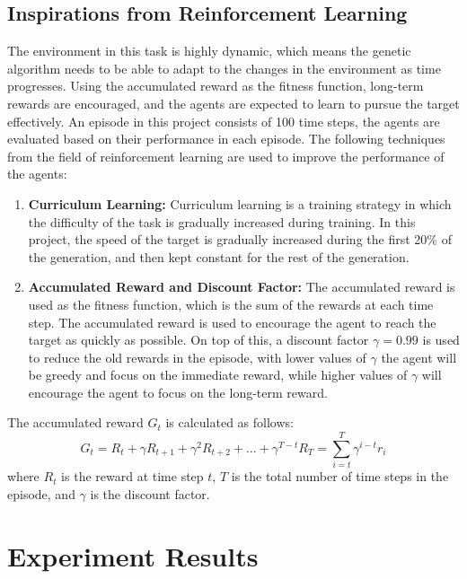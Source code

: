 \documentclass[sigconf]{acmart}
\begin{document}
\subsection{Inspirations from Reinforcement Learning}
The environment in this task is highly dynamic, which means the genetic algorithm needs to be able to adapt to the changes in the environment as time progresses. Using the accumulated reward as the fitness function, long-term rewards are encouraged, and the agents are expected to learn to pursue the target effectively.
An episode in this project consists of 100 time steps, the agents are evaluated based on their performance in each episode. The following techniques from the field of reinforcement learning are used to improve the performance of the agents:
\begin{enumerate}
  \item \textbf{Curriculum Learning:} Curriculum learning is a training strategy in which the difficulty of the task is gradually increased during training. In this project, the speed of the target is gradually increased during the first 20\% of the generation, and then kept constant for the rest of the generation.
  \item \textbf{Accumulated Reward and Discount Factor:} The accumulated reward is used as the fitness function, which is the sum of the rewards at each time step. The accumulated reward is used to encourage the agent to reach the target as quickly as possible. On top of this, a discount factor $\gamma = 0.99$ is used to reduce the old rewards in the episode, with lower values of $\gamma$ the agent will be greedy and focus on the immediate reward, while higher values of $\gamma$ will encourage the agent to focus on the long-term reward. 
\end{enumerate}
The accumulated reward $G_t$ is calculated as follows:
\begin{equation}
  G_t = R_t + \gamma R_{t+1} + \gamma^2 R_{t+2} + \ldots + \gamma^{T-t} R_T = \sum_{i=t}^{T} \gamma^{i-t} r_i
  \label{eq:discount}
\end{equation}
where $R_t$ is the reward at time step $t$, $T$ is the total number of time steps in the episode, and $\gamma$ is the discount factor.

\section{Experiment Results}
\end{document}
